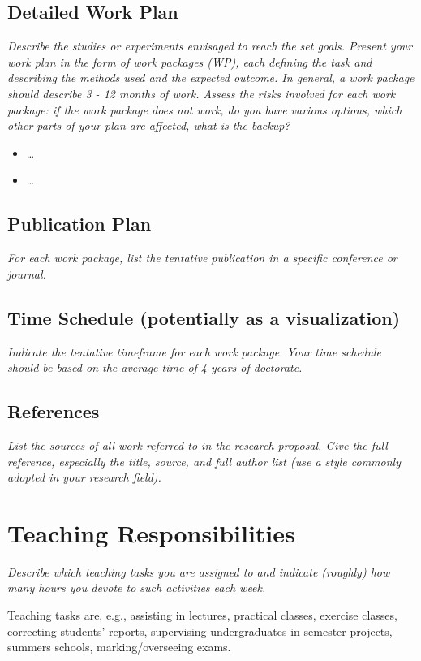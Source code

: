 \documentclass[11pt]{article}
\newcommand{\suggestion}[1]{{\itshape #1}}
\begin{document}
\subsection{Detailed Work Plan}
\suggestion{
Describe the studies or experiments envisaged to reach the set goals.
Present your work plan in the form of work packages (WP), each defining the task and describing the methods used and the expected outcome.
In general, a work package should describe 3 - 12 months of work.
Assess the risks involved for each work package: if the work package does not work, do you have various options, which other parts of your plan are affected, what is the backup?

\begin{itemize}
    \item [WP 1:] \dots
    \item [WP 2:] \dots
\end{itemize}
}

\subsection{Publication Plan}
\suggestion{
For each work package, list the tentative publication in a specific conference or journal.
}

\subsection{Time Schedule (potentially as a visualization)}
\suggestion{
Indicate the tentative timeframe for each work package.
Your time schedule should be based on the average time of 4 years of doctorate. 
}

\subsection{References}
\suggestion{
List the sources of all work referred to in the research proposal.
Give the full reference, especially the title, source, and full author list (use a style commonly adopted in your research field).
}

% 

% 



\section{Teaching Responsibilities}
\suggestion{
Describe which teaching tasks you are assigned to and indicate (roughly) how many hours you devote to such activities each week.

Teaching tasks are, e.g., assisting in lectures, practical classes, exercise classes, correcting students’ reports, supervising undergraduates in semester projects, summers schools, marking/overseeing exams.
}
\end{document}
